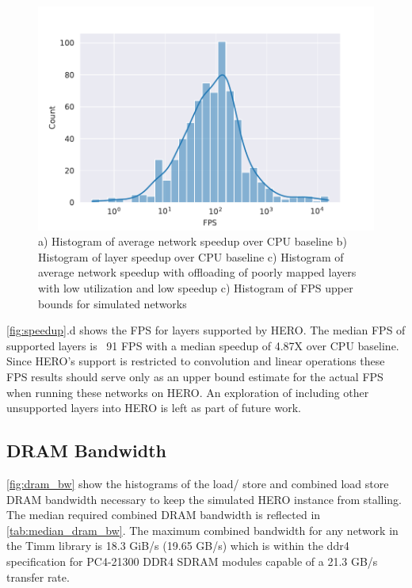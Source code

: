 \begin{figure}
    \hspace{0.1cm} 
    \includegraphics[scale=0.46]{Plots/latency/fps.pdf}
    \caption{a) Histogram of average network speedup over CPU baseline b) Histogram of layer speedup over CPU baseline c) Histogram of average network speedup with offloading of poorly mapped layers with low utilization and low speedup c) Histogram of FPS upper bounds for simulated networks}
    \label{fig:speedup}
\end{figure}

\autoref{fig:speedup}.d  shows the FPS for layers supported by HERO. The median
FPS of supported layers is ~91 FPS with a median speedup of 4.87X over CPU
baseline. Since HERO's support is restricted to convolution and linear
operations these FPS results should serve only as an upper bound estimate for the
actual FPS when running these networks on HERO. An exploration of including
other unsupported layers into HERO is left as part of future work.  

\subsection{DRAM Bandwidth}
\label{chap:hero:results:bw}

\autoref{fig:dram_bw} show the histograms of the load/ store and combined
load store DRAM bandwidth necessary to keep the simulated HERO instance from
stalling. The median required combined DRAM bandwidth is reflected in
\autoref{tab:median_dram_bw}. The maximum combined bandwidth for any network in
the Timm library is 18.3 GiB/s (19.65 GB/s) which is within the ddr4 specification for
PC4-21300 DDR4 SDRAM modules \cite{wiki:List_of_interface_bit_rates} capable of
a 21.3 GB/s transfer rate. 

